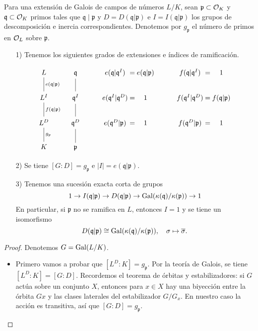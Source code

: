 \begin{teorema}
  \label{thm:campo-de-descomposicion-e-inercia}
  Para una extensión de Galois de campos de números $L/K$, sean
  $\mathfrak{p} \subset \mathcal{O}_K$ y $\mathfrak{q} \subset \mathcal{O}_K$ primos tales que
  $\mathfrak{q}\mid\mathfrak{p}$ y $D = D (\mathfrak{q}|\mathfrak{p})$
  e $I = I (\mathfrak{q}|\mathfrak{p})$ los grupos de descomposición
  e inercia correspondientes. Denotemos por $g_\mathfrak{p}$ el número de primos
  en $\mathcal{O}_L$ sobre $\mathfrak{p}$.

  \begin{enumerate}
  \item[1)] Tenemos los siguientes grados de extensiones e índices de
    ramificación.

    \[ \begin{tikzcd}
      L \ar[-]{d}{e (\mathfrak{q}|\mathfrak{p})} & \mathfrak{q} \ar[-]{d} & e (\mathfrak{q}|\mathfrak{q}^I) &[-3em] = &[-3em] e (\mathfrak{q}|\mathfrak{p}) & f (\mathfrak{q}|\mathfrak{q}^I) &[-3em] = &[-3em] 1 \\
      L^I \ar[-]{d}{f (\mathfrak{q}|\mathfrak{p})} & \mathfrak{q}^I \ar[-]{d} & e (\mathfrak{q}^I|\mathfrak{q}^D) & = & 1 & f (\mathfrak{q}^I|\mathfrak{q}^D) & = & f (\mathfrak{q}|\mathfrak{p}) \\
      L^D \ar[-]{d}{g_\mathfrak{p}} & \mathfrak{q}^D \ar[-]{d} & e (\mathfrak{q}^D|\mathfrak{p}) & = & 1 & f (\mathfrak{q}^D|\mathfrak{p}) & = & 1 \\
      K & \mathfrak{p}
    \end{tikzcd} \]

  \item[2)] Se tiene $[G : D] = g_\mathfrak{p}$ e
    $|I| = e (\mathfrak{q}|\mathfrak{p})$.

  \item[3)] Tenemos una sucesión exacta corta de grupos
    \[ 1 \to I (\mathfrak{q}|\mathfrak{p}) \to
    D (\mathfrak{q}|\mathfrak{p}) \to
    \operatorname{Gal} (\kappa(\mathfrak{q})/\kappa(\mathfrak{p})) \to 1 \]
    En particular, si $\mathfrak{p}$ no se ramifica en $L$, entonces $I = 1$
    y se tiene un isomorfismo
    \[ D (\mathfrak{q}|\mathfrak{p}) \cong
    \operatorname{Gal} (\kappa(\mathfrak{q})/\kappa(\mathfrak{p})), \quad
    \sigma \mapsto \overline{\sigma}. \]
  \end{enumerate}

  \begin{proof}
    Denotemos $G = \operatorname{Gal} (L/K)$.

    \begin{itemize}
      \item Primero vamos a probar que $[L^D : K] = g_\mathfrak{p}$. Por la
        teoría de Galois, se tiene $[L^D : K] = [G : D]$. Recordemos el
        teorema de órbitas y estabilizadores: si $G$ actúa sobre un conjunto
        $X$, entonces para $x \in X$ hay una biyección entre la órbita $Gx$ y
        las clases laterales del estabilizador $G/G_x$. En nuestro caso la
        acción es transitiva, así que $[G : D] = g_\mathfrak{p}$.


\end{itemize}
\end{proof}
\end{teorema}
